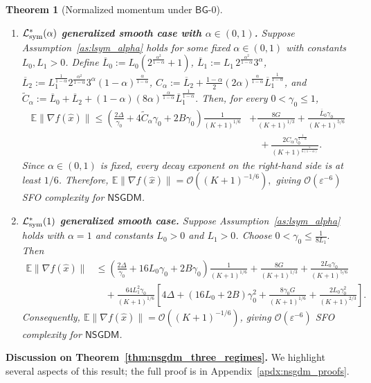 \documentclass[letter,11pt]{article}
\newtheorem{theorem}{Theorem}[]
\newcommand{\E}{\mathbb{E}}
\newcommand{\Ocal}{\mathcal{O}}
\newcommand{\Lcal}{\mathcal{L}}
\begin{document}
\begin{theorem}[Normalized momentum under $\mathsf{BG}$-0]
\begin{enumerate}[label=(\roman*), leftmargin=*]
\item \textbf{$\Lcal_{\rm sym}^*(\alpha)$ generalized smooth case with $\alpha\in(0,1)$.}
Suppose Assumption~\ref{as:lsym_alpha} holds for some fixed $\alpha\in(0,1)$ with constants $L_0, L_1>0$. Define $\overline L_0 := L_0\left(2^{\frac{\alpha^2}{1-\alpha}}+1\right)$, $\overline L_1 := L_1\,2^{\frac{\alpha^2}{1-\alpha}}3^\alpha$, $\overline L_2 := L_1^{\frac{1}{1-\alpha}} 2^{\frac{\alpha^2}{1-\alpha}} 3^\alpha (1-\alpha)^{\frac{\alpha}{1-\alpha}}$, $C_\alpha := \overline L_2 + \frac{1-\alpha}{2} (2\alpha)^{\frac{\alpha}{1-\alpha}} \overline L_1^{\frac{1}{1-\alpha}}$, and $\widetilde C_\alpha := \overline L_0+\overline L_2 +(1-\alpha) (8\alpha)^{\frac{\alpha}{1-\alpha}} \overline L_1^{\frac{1}{1-\alpha}}.$
Then, for every $0 < \gamma_0 \leq 1$,
\[
\begin{aligned}
\E\|\nabla f(\widehat x)\|
\le
\left(
    \frac{2\Delta}{\gamma_0}
    +4\widetilde C_\alpha\gamma_0
    +2B\gamma_0
\right)
\frac{1}{(K+1)^{1/6}}
&+
\frac{8G}{(K+1)^{1/3}}
+
\frac{\overline L_0\gamma_0}{(K+1)^{5/6}}
\\
&\quad+
\frac{
    2C_\alpha
    \gamma_0^{\frac{1}{1-\alpha}}
}{
    (K+1)^{\frac{5}{6(1-\alpha)}}
}.
\end{aligned}
\]
Since $\alpha\in(0,1)$ is fixed, every decay exponent on the right-hand side is at least $1/6$. Therefore, $\E\|\nabla f(\widehat x)\| = \Ocal\left((K+1)^{-1/6}\right),$ giving $\Ocal(\varepsilon^{-6})$ SFO complexity for $\mathsf{NSGDM}$.
\item \textbf{$\Lcal_{\rm sym}^*(1)$ generalized smooth case.}
Suppose Assumption~\ref{as:lsym_alpha} holds with $\alpha=1$ and constants
$L_0>0$ and $L_1>0$. Choose
$
    0<\gamma_0\le \frac{1}{8L_1}.
$
Then
\[
\begin{aligned}
\E\|\nabla f(\widehat x)\|
&\le
\left(
    \frac{2\Delta}{\gamma_0}
    +16L_0\gamma_0
    +2B\gamma_0
\right)\frac{1}{(K+1)^{1/6}}
+
\frac{8G}{(K+1)^{1/3}}
+
\frac{2L_0\gamma_0}{(K+1)^{5/6}}
\\
&\quad
+
\frac{64L_1^2\gamma_0}{(K+1)^{1/6}}
\left[
    4\Delta
    +(16L_0+2B)\gamma_0^2
    +\frac{8\gamma_0 G}{(K+1)^{1/6}}
    +\frac{2L_0\gamma_0^2}{(K+1)^{2/3}}
\right].
\end{aligned}
\]
Consequently, $\E\|\nabla f(\widehat x)\| = \Ocal\!\left((K+1)^{-1/6}\right)$, giving $\Ocal(\varepsilon^{-6})$ SFO complexity for $\mathsf{NSGDM}$.
\end{enumerate}
\end{theorem}
\textbf{Discussion on Theorem~\ref{thm:nsgdm_three_regimes}.}
We highlight several aspects of this result; the full proof is in Appendix~\ref{apdx:nsgdm_proofs}.
\end{document}
